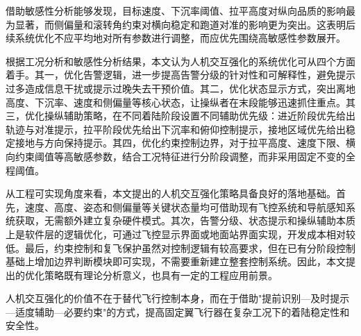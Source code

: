 借助敏感性分析能够发现，目标速度、下沉率阈值、拉平高度对纵向品质的影响最为显著，而侧偏量和滚转角约束对横向稳定和跑道对准的影响更为突出。这表明后续系统优化不应平均地对所有参数进行调整，而应优先围绕高敏感性参数展开。

根据工况分析和敏感性分析结果，本文认为人机交互强化的系统优化可从四个方面着手。其一，优化告警逻辑，进一步提高告警分级的针对性和可解释性，避免提示过多造成信息干扰或提示过晚失去干预价值。其二，优化状态显示方式，突出离地高度、下沉率、速度和侧偏量等核心状态，让操纵者在末段能够迅速抓住重点。其三，优化操纵辅助策略，在不同着陆阶段设置不同辅助优先级：进近阶段优先给出轨迹与对准提示，拉平阶段优先给出下沉率和俯仰控制提示，接地区域优先给出稳定接地与方向保持提示。其四，优化约束控制边界，对于拉平高度、速度下限、横向约束阈值等高敏感参数，结合工况特征进行分阶段调整，而非采用固定不变的全程阈值。

从工程可实现角度来看，本文提出的人机交互强化策略具备良好的落地基础。首先，速度、高度、姿态和侧偏量等关键状态量均可借助现有飞控系统和导航感知系统获取，无需额外建立复杂硬件模式。其次，告警分级、状态提示和操纵辅助本质上是软件层的逻辑优化，可通过飞控显示界面或地面站界面实现，开发成本相对较低。最后，约束控制和复飞保护虽然对控制逻辑有较高要求，但在已有分阶段控制基础上增加边界判断模块即可实现，不需要重新建立整套控制系统。因此，本文提出的优化策略既有理论分析意义，也具有一定的工程应用前景。

人机交互强化的价值不在于替代飞行控制本身，而在于借助"提前识别—及时提示—适度辅助—必要约束"的方式，提高固定翼飞行器在复杂工况下的着陆稳定性和安全性。
